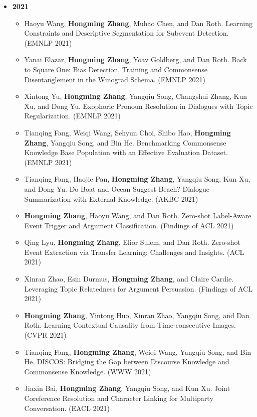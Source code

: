 \begin{itemize}[leftmargin=*, itemsep=0.35em, topsep=0.2em]
  \item[] \textbf{2021}
  \begin{itemize}[leftmargin=1.5em, itemsep=0.2em, topsep=0.1em]
    \item Haoyu Wang, \textbf{Hongming Zhang}, Muhao Chen, and Dan Roth. Learning Constraints and Descriptive Segmentation for Subevent Detection. (EMNLP 2021)
    \item Yanai Elazar, \textbf{Hongming Zhang}, Yoav Goldberg, and Dan Roth. Back to Square One: Bias Detection, Training and Commonsense Disentanglement in the Winograd Schema. (EMNLP 2021)
    \item Xintong Yu, \textbf{Hongming Zhang}, Yangqiu Song, Changshui Zhang, Kun Xu, and Dong Yu. Exophoric Pronoun Resolution in Dialogues with Topic Regularization. (EMNLP 2021)
    \item Tianqing Fang, Weiqi Wang, Sehyun Choi, Shibo Hao, \textbf{Hongming Zhang}, Yangqiu Song, and Bin He. Benchmarking Commonsense Knowledge Base Population with an Effective Evaluation Dataset. (EMNLP 2021)
    \item Tianqing Fang, Haojie Pan, \textbf{Hongming Zhang}, Yangqiu Song, Kun Xu, and Dong Yu. Do Boat and Ocean Suggest Beach? Dialogue Summarization with External Knowledge. (AKBC 2021)
    \item \textbf{Hongming Zhang}, Haoyu Wang, and Dan Roth. Zero-shot Label-Aware Event Trigger and Argument Classification. (Findings of ACL 2021)
    \item Qing Lyu, \textbf{Hongming Zhang}, Elior Sulem, and Dan Roth. Zero-shot Event Extraction via Transfer Learning: Challenges and Insights. (ACL 2021)
    \item Xinran Zhao, Esin Durmus, \textbf{Hongming Zhang}, and Claire Cardie. Leveraging Topic Relatedness for Argument Persuasion. (Findings of ACL 2021)
    \item \textbf{Hongming Zhang}, Yintong Huo, Xinran Zhao, Yangqiu Song, and Dan Roth. Learning Contextual Causality from Time-consecutive Images. (CVPR 2021)
    \item Tianqing Fang, \textbf{Hongming Zhang}, Weiqi Wang, Yangqiu Song, and Bin He. DISCOS: Bridging the Gap between Discourse Knowledge and Commonsense Knowledge. (WWW 2021)
    \item Jiaxin Bai, \textbf{Hongming Zhang}, Yangqiu Song, and Kun Xu. Joint Coreference Resolution and Character Linking for Multiparty Conversation. (EACL 2021)
  \end{itemize}


\end{itemize}
